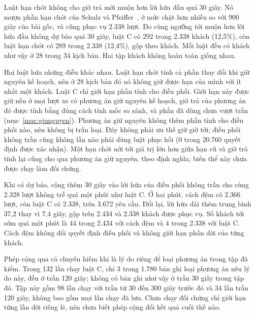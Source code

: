 Luật hạn chót không cho giờ trả mới muộn hơn lời hứa đầu quá 30 giây. Nó mượn phần hạn chót của Schulz và
Pfeiffer~\cite{schulz2026}, ở mức chặt hơn nhiều so với 900 giây của bài gốc, và cũng phục vụ 2.338 lượt.
Đo cùng ngưỡng tới muộn hơn lời hứa đầu không dự báo quá 30 giây, luật C có 292 trong 2.338 khách
(12,5\%), còn luật hạn chót có 289 trong 2.338 (12,4\%), gộp theo khách. Mỗi luật đều có khách như vậy
ở 28 trong 34 kịch bản. Hai tập khách không hoàn toàn giống nhau.

Hai luật hứa những điều khác nhau. Luật hạn chót tính cả phần thay đổi khi giữ nguyên kế hoạch, nên ở
28 kịch bản đó nó không giữ được hạn của mình với ít nhất một khách. Luật C chỉ giới hạn phần tính cho
điều phối. Giới hạn này được giữ nếu ở mọi lượt xe có phương án giữ nguyên kế hoạch, giờ trả của phương án
đó được tính bằng đúng cách tính mốc so sánh, và phần đã dùng chưa vượt trần
(mục~\ref{muc:giunguyen}). Phương án giữ nguyên không thêm phần tính cho điều phối nào, nên không bị
trần loại. Đây không phải ưu thế giữ giờ tới; điều phối không trần cũng không lần nào phải dùng luật phục hồi
(0 trong 20.760 quyết định được xác nhận). Một hạn chót nới tới giá trị lớn hơn giữa hạn cũ và giờ
trả tính lại cũng cho qua phương án giữ nguyên, theo định nghĩa; biến thể này chưa được chạy làm đối chứng.

Khi có dự báo, cộng thêm 30 giây vào lời hứa của điều phối không trần cho cùng 2.328 lượt không trễ quá
một phút như luật C. Ở hai phút, cách đệm có 2.366 lượt, còn luật C có 2.338, trên 3.672 yêu cầu.
Đổi lại, lời hứa dài thêm trung bình 37,2 thay vì 7,4 giây, gộp trên 2.434 và 2.338 khách được phục vụ.
Số khách tới sớm quá một phút là 44 trong 2.434 với cách đệm và 4 trong 2.338 với luật C.
Cách đệm không đổi quyết định điều phối và không giới hạn phần dời của từng khách.

Phép cộng qua cả chuyến hiếm khi là lý do riêng để loại phương án trong tập đã kiểm. Trong 132 lần chạy
luật C, chỉ 3 trong 1.780 bản ghi loại phương án nêu lý do này, đều ở trần 120 giây; không có bản ghi
như vậy ở trần 30 giây trong tập đó. Tập này gồm 98 lần chạy với trần từ 30 đến 300 giây trước đó và 34 lần trần 120 giây, không
bao gồm mọi lần chạy đã lưu. Chưa chạy đối chứng chỉ giới hạn từng lần dời riêng lẻ, nên chưa biết
phép cộng đổi kết quả cuối thế nào.

